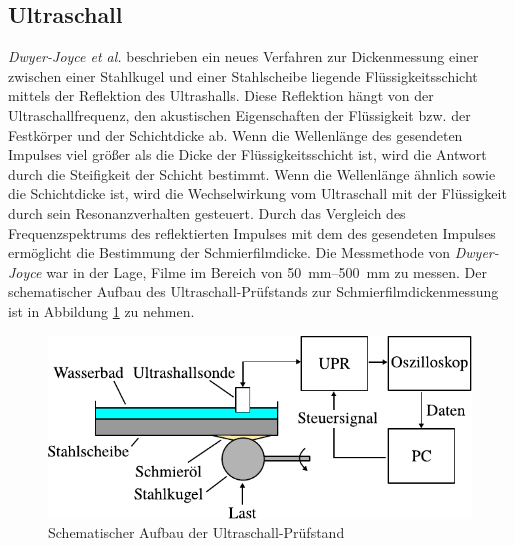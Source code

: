 \subsection{Ultraschall}
\label{sub:ultraschall}

\textit{Dwyer-Joyce et al.} \cite{dwyer-joyce_2011} beschrieben ein neues Verfahren zur Dickenmessung einer zwischen einer Stahlkugel und einer Stahlscheibe liegende Flüssigkeitsschicht mittels der Reflektion des Ultrashalls.
Diese Reflektion hängt von der Ultraschallfrequenz, den akustischen Eigenschaften der Flüssigkeit bzw. der Festkörper und der Schichtdicke ab.
Wenn die Wellenlänge des gesendeten Impulses viel größer als die Dicke der Flüssigkeitsschicht ist, wird die Antwort durch die Steifigkeit der Schicht bestimmt.
Wenn die Wellenlänge ähnlich sowie die Schichtdicke ist, wird die Wechselwirkung vom Ultraschall mit der Flüssigkeit durch sein Resonanzverhalten gesteuert.
Durch das Vergleich des Frequenzspektrums des reflektierten Impulses mit dem des gesendeten Impulses ermöglicht die Bestimmung der Schmierfilmdicke.
Die Messmethode von \textit{Dwyer-Joyce} war in der Lage, Filme im Bereich von \SIrange{50}{500}{\milli\meter} zu messen.
Der schematischer Aufbau des Ultraschall-Prüfstands zur Schmierfilmdickenmessung ist in Abbildung \ref{fig:ultrashall_pruefstand_dwyer-joyce} zu nehmen.
\begin{figure}[htb]
    \centering
    \includegraphics[]{./images/ultrashall_pruefstand_dwyer-joyce.pdf}
    \caption{Schematischer Aufbau der Ultraschall-Prüfstand \cite{dwyer-joyce_2011}}
    \label{fig:ultrashall_pruefstand_dwyer-joyce}
\end{figure}
%

